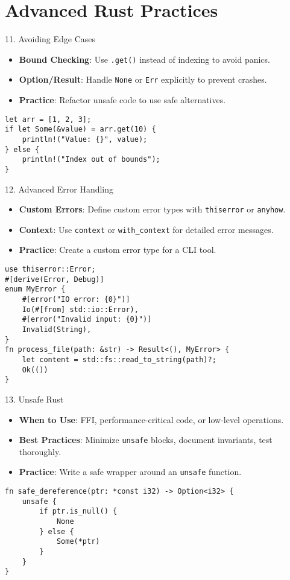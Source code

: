\documentclass[10pt]{beamer}
\begin{document}
\section{Advanced Rust Practices}
\begin{frame}{11. Avoiding Edge Cases}
    \begin{itemize}
        \item \textbf{Bound Checking}: Use \texttt{.get()} instead of indexing to avoid panics.
        \item \textbf{Option/Result}: Handle \texttt{None} or \texttt{Err} explicitly to prevent crashes.
        \item \textbf{Practice}: Refactor unsafe code to use safe alternatives.
    \end{itemize}
    \begin{lstlisting}
let arr = [1, 2, 3];
if let Some(&value) = arr.get(10) {
    println!("Value: {}", value);
} else {
    println!("Index out of bounds");
}
    \end{lstlisting}
\end{frame}

\begin{frame}{12. Advanced Error Handling}
    \begin{itemize}
        \item \textbf{Custom Errors}: Define custom error types with \texttt{thiserror} or \texttt{anyhow}.
        \item \textbf{Context}: Use \texttt{context} or \texttt{with\_context} for detailed error messages.
        \item \textbf{Practice}: Create a custom error type for a CLI tool.
    \end{itemize}
    \begin{lstlisting}
use thiserror::Error;
#[derive(Error, Debug)]
enum MyError {
    #[error("IO error: {0}")]
    Io(#[from] std::io::Error),
    #[error("Invalid input: {0}")]
    Invalid(String),
}
fn process_file(path: &str) -> Result<(), MyError> {
    let content = std::fs::read_to_string(path)?;
    Ok(())
}
    \end{lstlisting}
\end{frame}

\begin{frame}{13. Unsafe Rust}
    \begin{itemize}
        \item \textbf{When to Use}: FFI, performance-critical code, or low-level operations.
        \item \textbf{Best Practices}: Minimize \texttt{unsafe} blocks, document invariants, test thoroughly.
        \item \textbf{Practice}: Write a safe wrapper around an \texttt{unsafe} function.
    \end{itemize}
    \begin{lstlisting}
fn safe_dereference(ptr: *const i32) -> Option<i32> {
    unsafe {
        if ptr.is_null() {
            None
        } else {
            Some(*ptr)
        }
    }
}
    \end{lstlisting}
\end{frame}
\end{document}
